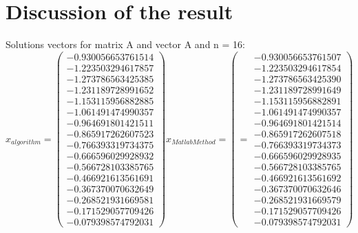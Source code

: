 \documentclass{report}
\begin{document}
\section{Discussion of the result}
Solutions vectors for matrix A and vector A and n = 16:
\[ x_{algorithm} = \left( \begin{array}{cc}
  -0.930056653761514 \\
  -1.223503294617857 \\
  -1.273786563425385 \\
  -1.231189728991652 \\
  -1.153115956882885 \\
  -1.061491474990357 \\
  -0.964691801421511 \\
  -0.865917262607523 \\
  -0.766393319734375 \\
  -0.666596029928932 \\
  -0.566728103385765 \\
  -0.466921613561691 \\
  -0.367370070632649 \\
  -0.268521931669581 \\
  -0.171529057709426 \\
  -0.079398574792031
\end{array} \right)
%
x_{Matlab Method} = \left(  = \begin{array}{cc}
  -0.930056653761507 \\
  -1.223503294617854 \\
  -1.273786563425390 \\
  -1.231189728991649 \\
  -1.153115956882891 \\
  -1.061491474990357 \\
  -0.964691801421514 \\
  -0.865917262607518 \\
  -0.766393319734373 \\
  -0.666596029928935 \\
  -0.566728103385765 \\
  -0.466921613561692 \\
  -0.367370070632646 \\
  -0.268521931669579 \\
  -0.171529057709426 \\
  -0.079398574792031
\end{array} \right)
\]
\end{document}
